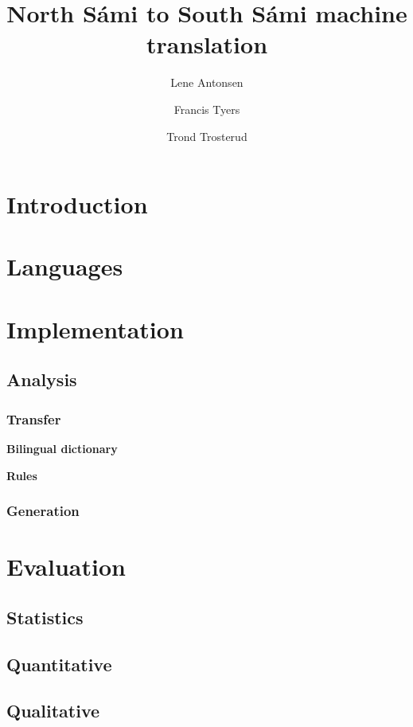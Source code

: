 \documentclass[a4paper,11pt,twocolumn]{article}
\title{North Sámi to South Sámi machine translation}
\author{Lene Antonsen \and Francis Tyers \and Trond Trosterud}
\date{}
\begin{document}
\maketitle

\section{Introduction}

\section{Languages}


\section{Implementation}


\subsection{Analysis}

\subsubsection{Transfer}

\textbf{Bilingual dictionary}

\textbf{Rules}

\subsubsection{Generation}

\section{Evaluation}

\subsection{Statistics}


\subsection{Quantitative}

\subsection{Qualitative}
\end{document}
